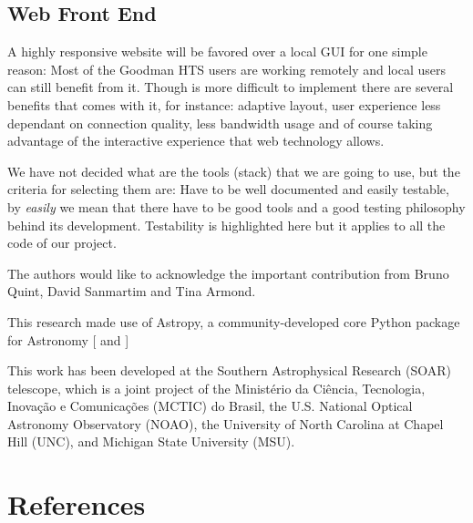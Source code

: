 \documentclass[11pt,twoside]{article}
\begin{document}
\subsection{Web Front End}
A highly responsive website will be favored over a local GUI for one simple reason: Most of the Goodman HTS users are working remotely and local users can still benefit from it. Though is more difficult to implement there are several benefits that comes with it, for instance: adaptive layout, user experience less dependant on connection quality, less bandwidth usage and of course taking advantage of the interactive experience that web technology allows.

We have not decided what are the tools (stack) that we are going to use, but the criteria for selecting them are: Have to be well documented and easily testable, by \emph{easily} we mean that there have to be good tools and a good testing philosophy behind its development. Testability is highlighted here but it applies to all the code of our project.


\acknowledgements

The authors would like to acknowledge the important contribution from Bruno Quint, David Sanmartim and Tina Armond.

This research made use of Astropy, a community-developed core Python package for Astronomy [\citet{2013A&A...558A..33A} and \citet{2018AJ....156..123A}] 

This work has been developed at the Southern Astrophysical Research (SOAR) telescope, which is a joint project of the Minist\'erio da Ci\^encia, Tecnologia, Inova\c{c}\~ao e Comunica\c{c}\~oes (MCTIC) do Brasil, the U.S. National Optical Astronomy Observatory (NOAO), the University of North Carolina at Chapel Hill (UNC), and Michigan State University (MSU). 

\section{References}


\end{document}
